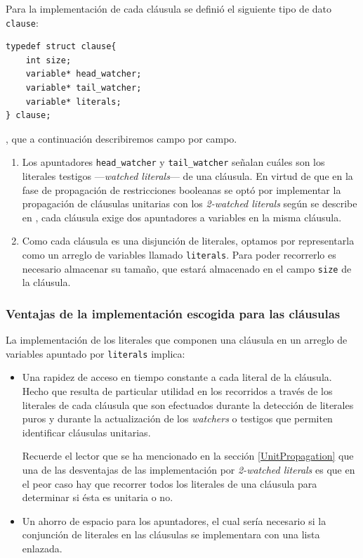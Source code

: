 \documentclass[12pt,lettersize,oneside]{article}
\begin{document}
Para la implementación de cada cláusula se definió el siguiente tipo de dato
{\tt clause}:
\begin{lstlisting}
typedef struct clause{
    int size;
    variable* head_watcher;
    variable* tail_watcher;
    variable* literals;
} clause;
\end{lstlisting}
, que a continuación describiremos campo por campo.\vspace{-2.5mm}
\begin{enumerate}
\item Los apuntadores {\tt head\_watcher} y {\tt tail\_watcher} señalan cuáles
  son los literales testigos ---\emph{watched literals}--- de una cláusula. En
  virtud de que en la fase de propagación de restricciones booleanas se optó por
  implementar la propagación de cláusulas unitarias con los \emph{2-watched
    literals} según se describe en \cite{Zhang},
  cada cláusula exige dos apuntadores a variables en la misma cláusula.

\item Como cada cláusula es una disjunción de literales, optamos por
  representarla como un arreglo de variables llamado {\tt literals}. Para poder
  recorrerlo es necesario almacenar su tamaño, que estará almacenado en el campo
  {\tt size} de la cláusula.
\end{enumerate}

\subsubsection{Ventajas de la implementación escogida para las cláusulas}
La implementación de los literales que componen una cláusula en un arreglo de
variables apuntado por {\tt literals} implica: \vspace{-2.5mm}
\begin{itemize}
\item Una rapidez de acceso en tiempo constante a cada literal de la
  cláusula. Hecho que resulta de particular utilidad en los recorridos a través
  de los literales de cada cláusula que son efectuados durante la detección de
  literales puros y durante la actualización de los \emph{watchers} o testigos
  que permiten identificar cláusulas unitarias. 

  Recuerde el lector que se ha mencionado en la sección \ref{UnitPropagation} que
  una de las desventajas de las implementación por \emph{2-watched literals} es
  que en el peor caso hay que recorrer todos los literales de una cláusula para
  determinar si ésta es unitaria o no.

\item Un ahorro de espacio para los apuntadores, el cual sería necesario si la
  conjunción de literales en las cláusulas se implementara con una lista
  enlazada.
\end{itemize}
\end{document}
